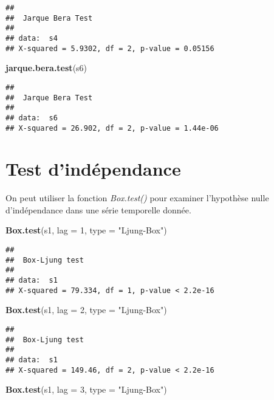 \documentclass[
]{book}
\newenvironment{Shaded}{\begin{snugshade}}{\end{snugshade}}
\newcommand{\AttributeTok}[1]{\textcolor[rgb]{0.13,0.29,0.53}{#1}}
\newcommand{\DecValTok}[1]{\textcolor[rgb]{0.00,0.00,0.81}{#1}}
\newcommand{\FunctionTok}[1]{\textcolor[rgb]{0.13,0.29,0.53}{\textbf{#1}}}
\newcommand{\NormalTok}[1]{#1}
\newcommand{\StringTok}[1]{\textcolor[rgb]{0.31,0.60,0.02}{#1}}
\theoremstyle{definition}
\theoremstyle{definition}
\theoremstyle{definition}
\theoremstyle{definition}
\theoremstyle{remark}
\begin{document}
\begin{verbatim}
## 
##  Jarque Bera Test
## 
## data:  s4
## X-squared = 5.9302, df = 2, p-value = 0.05156
\end{verbatim}

\begin{Shaded}
\begin{Highlighting}[]
\FunctionTok{jarque.bera.test}\NormalTok{(s6)}
\end{Highlighting}
\end{Shaded}

\begin{verbatim}
## 
##  Jarque Bera Test
## 
## data:  s6
## X-squared = 26.902, df = 2, p-value = 1.44e-06
\end{verbatim}

\hypertarget{test-dinduxe9pendance}{%
\section{Test d'indépendance}\label{test-dinduxe9pendance}}

On peut utiliser la fonction \emph{Box.test()} pour examiner l'hypothèse nulle d'indépendance dans une série temporelle donnée.

\begin{Shaded}
\begin{Highlighting}[]
\FunctionTok{Box.test}\NormalTok{(s1, }\AttributeTok{lag =} \DecValTok{1}\NormalTok{, }\AttributeTok{type =} \StringTok{"Ljung{-}Box"}\NormalTok{)}
\end{Highlighting}
\end{Shaded}

\begin{verbatim}
## 
##  Box-Ljung test
## 
## data:  s1
## X-squared = 79.334, df = 1, p-value < 2.2e-16
\end{verbatim}

\begin{Shaded}
\begin{Highlighting}[]
\FunctionTok{Box.test}\NormalTok{(s1, }\AttributeTok{lag =} \DecValTok{2}\NormalTok{, }\AttributeTok{type =} \StringTok{"Ljung{-}Box"}\NormalTok{)}
\end{Highlighting}
\end{Shaded}

\begin{verbatim}
## 
##  Box-Ljung test
## 
## data:  s1
## X-squared = 149.46, df = 2, p-value < 2.2e-16
\end{verbatim}

\begin{Shaded}
\begin{Highlighting}[]
\FunctionTok{Box.test}\NormalTok{(s1, }\AttributeTok{lag =} \DecValTok{3}\NormalTok{, }\AttributeTok{type =} \StringTok{"Ljung{-}Box"}\NormalTok{)}
\end{Highlighting}
\end{Shaded}
\end{document}
